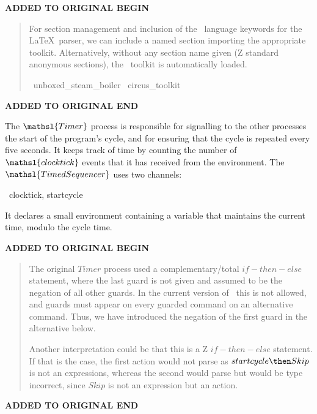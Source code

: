 \documentclass{report}
\newcommand{\event}[1]{\mathsl{#1}}
\newenvironment{addedstuff}{\begin{flushleft}\textbf{ADDED TO ORIGINAL BEGIN}\begin{quote}\begin{minipage}{.8\textwidth}}{\end{minipage}\end{quote}\textbf{ADDED TO ORIGINAL END}\end{flushleft}}
\begin{document}
\begin{addedstuff}
For section management and inclusion of the \Circus\ language keywords
for the \LaTeX\ parser, we can include a named section importing the
appropriate toolkit. Alternatively, without any section name given (Z
standard anonymous sections), the \Circus\ toolkit is automatically loaded.
%
\begin{zsection}
  \SECTION\ unboxed\_steam\_boiler \parents\ circus\_toolkit
\end{zsection}
\end{addedstuff}

The \( \mathsl{Timer} \)\/ process is responsible for signalling to
the other processes the start of the program's cycle, and for ensuring
that the cycle is repeated every five seconds.  It keeps track of time
by counting the number of \( \event{clocktick} \)\/ events that it has
received from the environment.  The \( \mathsl{TimedSequencer} \)\/
uses two channels:
\begin{circus}
    \circchannel\ clocktick, startcycle
\end{circus}

It declares a small environment containing a variable that maintains
the current time, modulo the cycle time.

\begin{addedstuff}
   The original $Timer$ process used a complementary/total $if-then-else$ statement,
   where the last guard is not given and assumed to be the negation of all other guards.
   In the current version of \Circus\ this is not allowed, and guards must appear on every guarded command
   on an alternative command. Thus, we have introduced the negation of the first guard in the alternative below.

   Another interpretation could be that this is a Z $if-then-else$ statement. If that is the
   case, the first action would not parse as $startcycle \then Skip$ is not an expressions,
   whereas the second would parse but would be type incorrect, since $Skip$ is not an
   expression but an action.
\end{addedstuff}
\end{document}
